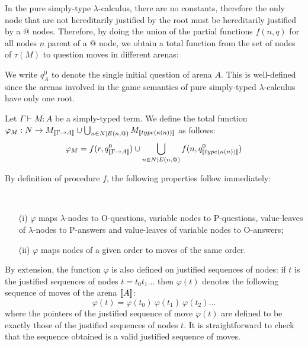 In the pure simply-type $\lambda$-calculus, there are no constants, therefore the only node that are not hereditarily justified
by the root must be hereditarily justified by a $@$ nodes. Therefore, by doing the union of the partial functions $f(n,q)$
for all nodes $n$ parent of a $@$ node, we obtain a total function from the set of nodes of $\tau(M)$ to question moves in different arenas:

We write $q^0_A$ to denote the single initial question of arena $A$.
This is well-defined since the arenas involved in the game semantics
of pure simply-typed $\lambda$-calculus have only one root.


\begin{dfn}
Let $\Gamma \vdash M : A$ be a simply-typed term. We define the
total function $\varphi_M : N \rightarrow M_{[\![ \Gamma \rightarrow
A ]\!]} \cup \bigcup_{n \in N | E(n, @)} M_{{[\![ type(\kappa(n)) ]\!]}}$ as
follows:
$$\varphi_M = f(r, q^0_{{[\![ \Gamma \rightarrow A ]\!]}}) \cup \bigcup_{n \in N | E(n, @)}  f(n, q^0_{{[\![ type(\kappa(n)) ]\!]}} ) $$
\end{dfn}

By definition of procedure $f$, the following properties follow
immediately:
\begin{property} \
\label{proper:phi_conserve_order}
\begin{itemize}
\item[(i)] $\varphi$ maps $\lambda$-nodes to O-questions, variable nodes to
P-questions, value-leaves of $\lambda$-nodes to P-answers and
value-leaves of variable nodes to O-answers;
\item[(ii)] $\varphi$ maps nodes of a given order to moves of the same order.
\end{itemize}
\end{property}


By extension, the function $\varphi$ is also defined on justified
sequences of nodes: if $t$ is the justified sequences of nodes $t =
t_0 t_1 \ldots$ then $\varphi(t)$ denotes the following sequence of
moves of the arena ${[\![ A ]\!]}$:
$$\varphi(t) = \varphi(t_0)\ \varphi(t_1)\  \varphi(t_2) \ldots$$
where the pointers of the justified sequence of move $\varphi(t)$
are defined to be exactly those of the justified sequences of nodes
$t$. It is straightforward to check that the sequence obtained is a
valid justified sequence of moves.


